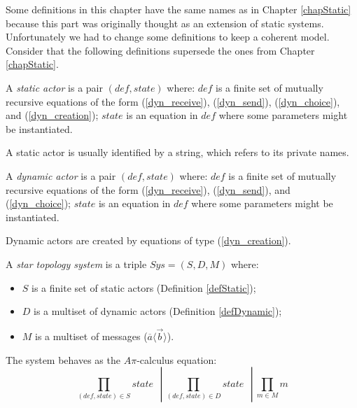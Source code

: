 \documentclass[a4paper]{report}
\numberwithin{algorithm}{chapter}
\begin{document}
\begin{rem}
Some definitions in this chapter have the same names as in Chapter \ref{chapStatic} because this part was originally thought as an extension of static systems.
Unfortunately we had to change some definitions to keep a coherent model.
Consider that the following definitions supersede the ones from Chapter \ref{chapStatic}.
\end{rem}


\begin{define}
\label{defStatic}
A \emph{static actor} is a pair $(\mathit{def},\mathit{state})$ where:
$\mathit{def}$ is a finite set of mutually recursive equations of the form
(\ref{dyn_receive}), (\ref{dyn_send}), (\ref{dyn_choice}), and (\ref{dyn_creation});
$\mathit{state}$ is an equation in $\mathit{def}$ where some parameters might be instantiated.
\end{define}

\begin{rem}
A static actor is usually identified by a string, which refers to its private names.
\end{rem}

\begin{define}
\label{defDynamic}
A \emph{dynamic actor} is a pair $(\mathit{def},\mathit{state})$ where:
$\mathit{def}$ is a finite set of mutually recursive equations of the form
(\ref{dyn_receive}), (\ref{dyn_send}), and (\ref{dyn_choice});
$\mathit{state}$ is an equation in $\mathit{def}$ where some parameters might be instantiated.
\end{define}

\begin{rem}
Dynamic actors are created by equations of type (\ref{dyn_creation}).
\end{rem}

\begin{define}
\label{defDynSys}
A \emph{star topology system} is a triple $\mathit{Sys} = (S,D,M)$ where:
\begin{itemize}
\item $S$ is a finite set of static actors (Definition \ref{defStatic});
\item $D$ is a multiset of dynamic actors (Definition \ref{defDynamic});
\item $M$ is a multiset of messages ($\overline a \langle \vec b \rangle$).
\end{itemize}

The system behaves as the $A\pi$-calculus equation:
\begin{equation*}
\prod_{(\mathit{def},\mathit{state}) \in S} \mathit{state} ~~~  \left| ~
\prod_{(\mathit{def},\mathit{state}) \in D} \mathit{state} ~~~ \right| ~
\prod_{m \in M} m
\end{equation*}
\end{define}
\end{document}
